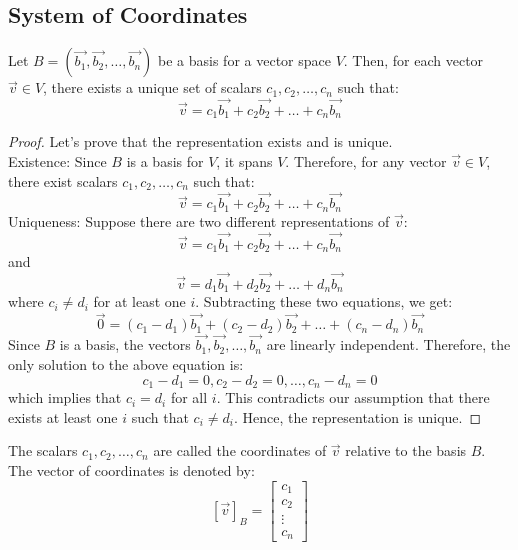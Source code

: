 \subsection{System of Coordinates}
\begin{theorem}
    Let $B = (\vec{b_1}, \vec{b_2}, \ldots, \vec{b_n})$ be a basis for a vector space $V$. Then, for each vector $\vec{v} \in V$, there exists a unique set of scalars $c_1, c_2, \ldots, c_n$ such that:
    \[ \vec{v} = c_1 \vec{b_1} + c_2 \vec{b_2} + \ldots + c_n \vec{b_n} \]
\end{theorem}
\begin{proof}
    Let's prove that the representation exists and is unique. \\
    Existence: Since $B$ is a basis for $V$, it spans $V$. Therefore, for any vector $\vec{v} \in V$, there exist scalars $c_1, c_2, \ldots, c_n$ such that:
    \[ \vec{v} = c_1 \vec{b_1} + c_2 \vec{b_2} + \ldots + c_n \vec{b_n} \]
    Uniqueness: Suppose there are two different representations of $\vec{v}$:
    \[ \vec{v} = c_1 \vec{b_1} + c_2 \vec{b_2} + \ldots + c_n \vec{b_n} \]
    and
    \[ \vec{v} = d_1 \vec{b_1} + d_2 \vec{b_2} + \ldots + d_n \vec{b_n} \]
    where $c_i \neq d_i$ for at least one $i$. Subtracting these two equations, we get:
    \[ \vec{0} = (c_1 - d_1) \vec{b_1} + (c_2 - d_2) \vec{b_2} + \ldots + (c_n - d_n) \vec{b_n} \]
    Since $B$ is a basis, the vectors $\vec{b_1}, \vec{b_2}, \ldots, \vec{b_n}$ are linearly independent. Therefore, the only solution to the above equation is:
    \[ c_1 - d_1 = 0, c_2 - d_2 = 0, \ldots, c_n - d_n = 0 \]
    which implies that $c_i = d_i$ for all $i$. This contradicts our assumption that there exists at least one $i$ such that $c_i \neq d_i$. Hence, the representation is unique.
\end{proof}

\begin{definition}
    The scalars $c_1, c_2, \ldots, c_n$ are called the coordinates of $\vec{v}$ relative to the basis $B$. The vector of coordinates is denoted by:
    \[ [\vec{v}]_B = \begin{bmatrix}
        c_1 \\ c_2 \\ \vdots \\ c_n
    \end{bmatrix} \]
\end{definition}

